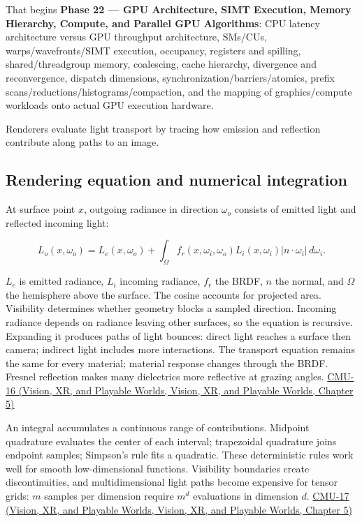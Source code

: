 That begins \textbf{Phase 22 --- GPU Architecture, SIMT Execution, Memory Hierarchy, Compute, and Parallel GPU Algorithms}: CPU latency architecture versus GPU throughput architecture, SMs/CUs, warps/wavefronts/SIMT execution, occupancy, registers and spilling, shared/threadgroup memory, coalescing, cache hierarchy, divergence and reconvergence, dispatch dimensions, synchronization/barriers/atomics, prefix scans/reductions/histograms/compaction, and the mapping of graphics/compute workloads onto actual GPU execution hardware.

Renderers evaluate light transport by tracing how emission and reflection contribute along paths to an image.

\subsection{Rendering equation and numerical integration}\label{03-visual-computing-i-ch011-rendering-equation-and-numerical-integration}

At surface point \(x\), outgoing radiance in direction \(\omega_o\) consists of emitted light and reflected incoming light:

\[
L_o(x,\omega_o)=L_e(x,\omega_o)+\int_\Omega f_r(x,\omega_i,\omega_o)L_i(x,\omega_i)|n\cdot\omega_i|\,d\omega_i.
\]

\(L_e\) is emitted radiance, \(L_i\) incoming radiance, \(f_r\) the BRDF, \(n\) the normal, and \(\Omega\) the hemisphere above the surface. The cosine accounts for projected area. Visibility determines whether geometry blocks a sampled direction. Incoming radiance depends on radiance leaving other surfaces, so the equation is recursive. Expanding it produces paths of light bounces: direct light reaches a surface then camera; indirect light includes more interactions. The transport equation remains the same for every material; material response changes through the BRDF. Fresnel reflection makes many dielectrics more reflective at grazing angles. \href{../07-Vision-XR-and-Playable-Worlds/main.pdf\#nameddest=04-visual-computing-ii-ch036-cmu-16---the-rendering-equation}{CMU-16 (Vision, XR, and Playable Worlds, Vision, XR, and Playable Worlds, Chapter 5)}

An integral accumulates a continuous range of contributions. Midpoint quadrature evaluates the center of each interval; trapezoidal quadrature joins endpoint samples; Simpson's rule fits a quadratic. These deterministic rules work well for smooth low-dimensional functions. Visibility boundaries create discontinuities, and multidimensional light paths become expensive for tensor grids: \(m\) samples per dimension require \(m^d\) evaluations in dimension \(d\). \href{../07-Vision-XR-and-Playable-Worlds/main.pdf\#nameddest=04-visual-computing-ii-ch036-cmu-17---numerical-integration}{CMU-17 (Vision, XR, and Playable Worlds, Vision, XR, and Playable Worlds, Chapter 5)}

